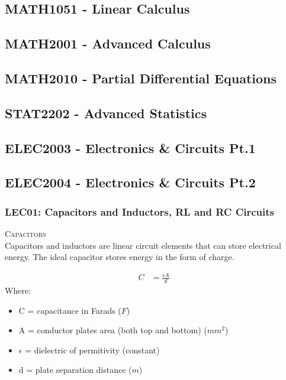\subsection{MATH1051 - Linear Calculus}
\clearpage

\subsection{MATH2001 - Advanced Calculus}
\clearpage

\subsection{MATH2010 - Partial Differential Equations}
\clearpage

\subsection{STAT2202 - Advanced Statistics}
\clearpage

\subsection{ELEC2003 - Electronics \& Circuits Pt.1}
\clearpage

\subsection{ELEC2004 - Electronics \& Circuits Pt.2}
\subsubsection{LEC01: Capacitors and Inductors, RL and RC Circuits}
\textsc{\large Capacitors}\\
Capacitors and inductors are linear circuit elements that can store electrical energy. The ideal capacitor stores energy in the form of charge.

\begin{align} \label{eq_ELEC2004_capacitance}
  C &= \frac{\epsilon A}{d}
\end{align}
Where:
\begin{itemize}
  \item C = capacitance in Farads ($F$)
  \item A = conductor plates area (both top and bottom) ($mm^2$)
  \item $\epsilon$ = dielectric of permitivity (constant)
  \item d = plate separation distance ($m$)
\end{itemize}


